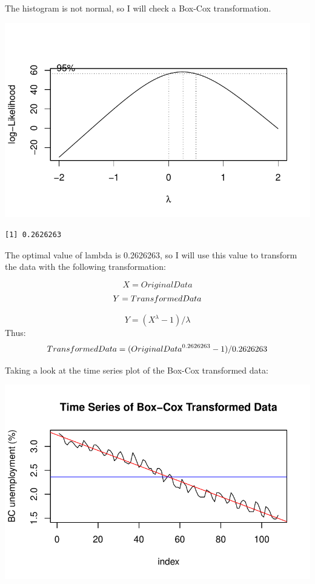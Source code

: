 \documentclass[
  letterpaper,
  DIV=11,
  numbers=noendperiod]{scrartcl}
\begin{document}
The histogram is not normal, so I will check a Box-Cox transformation.

\includegraphics{Final_Project_files/figure-pdf/unnamed-chunk-6-1.pdf}

\begin{verbatim}
[1] 0.2626263
\end{verbatim}

The optimal value of lambda is 0.2626263, so I will use this value to
transform the data with the following transformation:

\[
X = Original Data
\] \[
Y = Transformed\space Data
\]

\[
Y = (X^\lambda - 1)/\lambda
\] Thus: \[
Transformed \space Data = ({Original \space Data}^{0.2626263} - 1)/0.2626263
\]

Taking a look at the time series plot of the Box-Cox transformed data:

\includegraphics{Final_Project_files/figure-pdf/unnamed-chunk-7-1.pdf}
\end{document}
